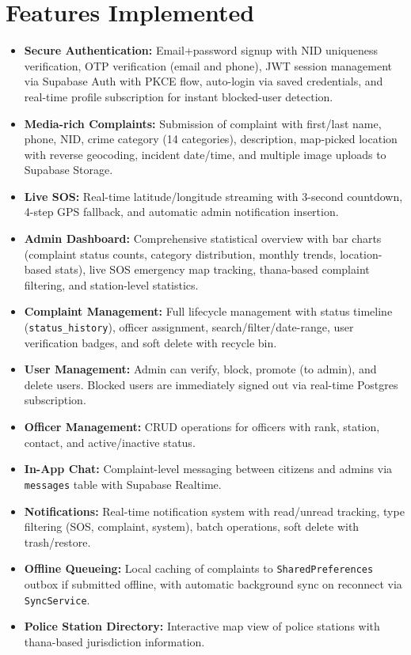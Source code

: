 \documentclass[12pt, a4paper, twoside]{report}
\begin{document}
\section{Features Implemented}
\begin{itemize}
    \item \textbf{Secure Authentication:} Email+password signup with NID uniqueness verification, OTP verification (email and phone), JWT session management via Supabase Auth with PKCE flow, auto-login via saved credentials, and real-time profile subscription for instant blocked-user detection.
    \item \textbf{Media-rich Complaints:} Submission of complaint with first/last name, phone, NID, crime category (14 categories), description, map-picked location with reverse geocoding, incident date/time, and multiple image uploads to Supabase Storage.
    \item \textbf{Live SOS:} Real-time latitude/longitude streaming with 3-second countdown, 4-step GPS fallback, and automatic admin notification insertion.
    \item \textbf{Admin Dashboard:} Comprehensive statistical overview with bar charts (complaint status counts, category distribution, monthly trends, location-based stats), live SOS emergency map tracking, thana-based complaint filtering, and station-level statistics.
    \item \textbf{Complaint Management:} Full lifecycle management with status timeline (\texttt{status\_history}), officer assignment, search/filter/date-range, user verification badges, and soft delete with recycle bin.
    \item \textbf{User Management:} Admin can verify, block, promote (to admin), and delete users. Blocked users are immediately signed out via real-time Postgres subscription.
    \item \textbf{Officer Management:} CRUD operations for officers with rank, station, contact, and active/inactive status.
    \item \textbf{In-App Chat:} Complaint-level messaging between citizens and admins via \texttt{messages} table with Supabase Realtime.
    \item \textbf{Notifications:} Real-time notification system with read/unread tracking, type filtering (SOS, complaint, system), batch operations, soft delete with trash/restore.
    \item \textbf{Offline Queueing:} Local caching of complaints to \texttt{SharedPreferences} outbox if submitted offline, with automatic background sync on reconnect via \texttt{SyncService}.
    \item \textbf{Police Station Directory:} Interactive map view of police stations with thana-based jurisdiction information.
\end{itemize}
\end{document}
